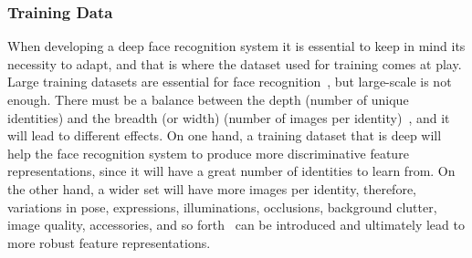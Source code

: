 \documentclass[class=report, crop=false, a4paper, 12pt]{standalone}
\begin{document}
\subsubsection{\large Training Data}
\par When developing a deep face recognition system it is essential to keep in mind its necessity to adapt, and that is where the dataset used for training comes at play. Large training datasets are essential for face recognition~\autocite{parkhiDeepFaceRecognition2015}, but large-scale is not enough. There must be a balance between the depth (number of unique identities) and the breadth (or width) (number of images per identity)~\autocite{bansalDonTsCNNbased2017, caoVGGFace2DatasetRecognising2018}, and it will lead to different effects. On one hand, a training dataset that is deep will help the face recognition system to produce more discriminative feature representations, since it will have a great number of identities to learn from. On the other hand, a wider set will have more images per identity, therefore, variations in pose, expressions, illuminations, occlusions, background clutter, image quality, accessories, and so forth~\autocite{baeDigiFace1MMillionDigital2023} can be introduced and ultimately lead to more robust feature representations.

% 
\end{document}
